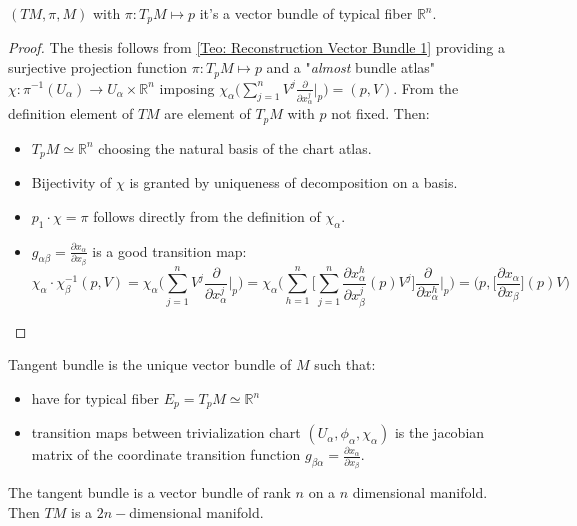 \documentclass[a4paper,12pt]{scrartcl}    %
\begin{document}
\begin{corollary}
$ (TM, \pi, M)$ with $\pi: T_p M \mapsto {p}$ it's a vector bundle of typical fiber $\mathbb{R}^n$.
\end{corollary}
\begin{proof}
The thesis follows from \ref{Teo: Reconstruction Vector Bundle 1} providing a surjective projection function $\pi : T_p M \mapsto {p}$ and a "\emph{almost} bundle atlas" $\chi: \pi^{-1} ( U_\alpha) \rightarrow U_\alpha \times \mathbb{R}^n $ imposing $\chi_\alpha \big( \sum_{j=1}^n V^j \frac{\partial}{\partial x_\alpha^j} \big\vert_p \big) = (p,V) $.
From the definition element of $TM$ are element of $T_pM$ with $p$ not fixed. Then:
\begin{itemize}
\item $T_pM \simeq \mathbb{R}^n$ choosing the natural basis of the chart atlas.
\item Bijectivity of $\chi$ is granted by uniqueness of decomposition on a basis.
\item $p_1 \cdot \chi = \pi $ follows directly from the definition of $\chi_\alpha$.
\item $g_{\alpha \beta} = \frac{\partial x_\alpha}{\partial x_\beta}$ is a good transition map:
\begin{displaymath}
\chi_\alpha \cdot \chi_\beta ^{-1} (p,V) = \chi_\alpha \Big( \sum_{j=1}^n V^j \frac{\partial}{\partial x_\alpha^j} \big\vert_p \Big) = \chi_\alpha \Big( \sum_{h=1}^n \Big [ \sum_{j=1}^n \frac{\partial x_\alpha ^h}{\partial x_\beta^j}(p) V^j\Big] \frac{\partial}{\partial x_\alpha^h} \big\vert_p \Big) = \Big( p, \Big[\frac{\partial x_\alpha}{\partial x_\beta}\Big](p) V \Big)
\end{displaymath}
\end{itemize}
\end{proof}

\begin{TAM}
Tangent bundle is the unique vector bundle of $M$ such that:
\begin{itemize}
\item have for typical fiber $E_p = T_p M \simeq \mathbb{R}^n$
\item transition maps between trivialization chart $(U_\alpha , \phi_\alpha, \chi_\alpha )$ is the jacobian matrix of the coordinate transition function $ g_{\beta \alpha} = \frac{\partial x_\alpha}{\partial x_\beta}$.
\end{itemize}
\end{TAM}

\begin{observation}
The tangent bundle is a vector bundle of rank $n$ on a $n$ dimensional manifold.
\\
Then $TM$ is a $2n-$dimensional manifold.
\end{observation}
\end{document}
